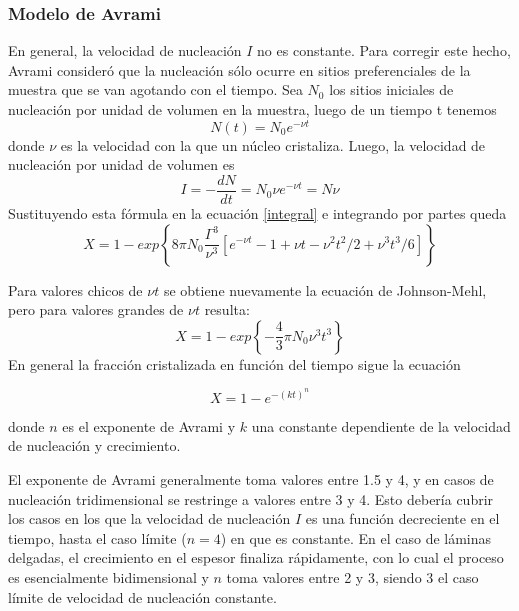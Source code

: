 \documentclass[12pt]{article}
\theoremstyle{definition}
\theoremstyle{remark}
\begin{document}
\subsubsection{Modelo de Avrami}
En general, la velocidad de nucleación $I$ no es constante. Para corregir este hecho, Avrami consideró que la nucleación sólo ocurre en sitios preferenciales de la muestra que se van agotando con el tiempo. Sea $N_0$ los sitios iniciales de nucleación por unidad de volumen en la muestra, luego de un tiempo t tenemos
\begin{equation}
	N(t) = N_0e^{-\nu t}
\end{equation}
donde $\nu$ es la velocidad con la que un núcleo cristaliza. Luego, la velocidad de nucleación por unidad de volumen es 
\begin{equation}
	I = -\frac{dN}{dt} = N_0\nu e^{-\nu t} = N\nu
\end{equation}
Sustituyendo esta fórmula en la ecuación \ref{integral} e integrando por partes queda
\begin{equation}
	X = 1-exp \left\lbrace 8\pi N_0\frac{\Gamma^3}{\nu^3} \left[ e^{-\nu t} -1+\nu t -\nu^2t^2/2 + \nu^3 t^3/6 \right] \right\rbrace
\end{equation}

Para valores chicos de $\nu t$ se obtiene nuevamente la ecuación de Johnson-Mehl, pero para valores grandes de $\nu t$ resulta:
\begin{equation}
	X = 1 - exp\left\lbrace -\frac{4}{3} \pi N_0 \nu^3 t^3 \right\rbrace
\end{equation}
En general la fracción cristalizada en función del tiempo sigue la ecuación

\begin{equation}
	X = 1 - e^{-(kt)^n}
\end{equation}

donde $n$ es el exponente de Avrami y $k$ una constante dependiente de la velocidad de nucleación y crecimiento.

	El exponente de Avrami generalmente toma valores entre 1.5 y 4, y en casos de nucleación tridimensional se restringe a valores entre 3 y 4. Esto debería cubrir los casos en los que la velocidad de nucleación $I$ es una función decreciente en el tiempo, hasta el caso límite ($n = 4$) en que es constante. En el caso de láminas delgadas, el crecimiento en el espesor finaliza rápidamente, con lo cual el proceso es esencialmente bidimensional y $n$ toma valores entre 2 y 3, siendo 3 el caso límite de velocidad de nucleación constante. 
	
\end{document}
